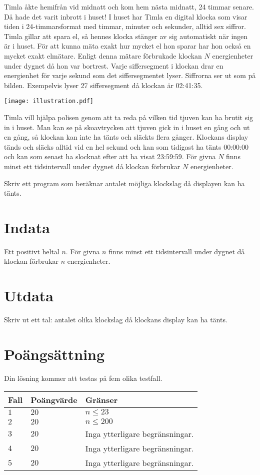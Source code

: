 Timla åkte hemifrån vid midnatt och kom hem nästa midnatt, 24 timmar senare. Då hade det varit inbrott i huset! 
I huset har Timla en digital klocka som visar tiden i 24-timmarsformat med timmar, minuter och sekunder, alltid sex siffror. Timla gillar att spara el, så hennes klocka stänger av sig automatiskt när ingen är i huset. För att kunna mäta exakt hur mycket el hon sparar har hon också en mycket exakt elmätare. Enligt denna mätare förbrukade klockan $N$ energienheter under dygnet då hon var bortrest. Varje siffersegment i klockan drar en energienhet för varje sekund som det siffersegmentet lyser. Siffrorna ser ut som på bilden. Exempelvis lyser 27 siffersegment då klockan är 02:41:35.

\begin{center}
  \texttt{[image: illustration.pdf]}
\end{center}

Timla vill hjälpa polisen genom att ta reda på vilken tid tjuven kan ha brutit sig in i huset. Man kan se på skoavtrycken att tjuven gick in i huset en gång och ut en gång, så klockan kan inte ha tänts och släckts flera gånger. Klockans display tänds och släcks alltid vid en hel sekund och kan som tidigast ha tänts 00:00:00 och kan som senast ha slocknat efter att ha visat 23:59:59. För givna $N$ finns minst ett tidsintervall under dygnet då klockan förbrukar $N$ energienheter.

Skriv ett program som beräknar antalet möjliga klockslag då displayen kan ha tänts. 

\section*{Indata}
Ett positivt heltal $n$. För givna $n$ finns minst ett tidsintervall under dygnet då klockan förbrukar $n$ energienheter.

\section*{Utdata}
Skriv ut ett tal: antalet olika klockslag då klockans display kan ha tänts. 

\section*{Poängsättning}
Din lösning kommer att testas på fem olika testfall.

\noindent
\begin{tabular}{| l | l | l |}
  \hline
  Fall & Poängvärde & Gränser \\ \hline
  $1$    & $20$        &  $n \le 23$ \\ \hline 
  $2$    & $20$        &  $n \le 200$ \\ \hline 
  $3$    & $20$        &  Inga ytterligare begränsningar. \\ \hline
  $4$    & $20$        &  Inga ytterligare begränsningar. \\ \hline
  $5$    & $20$        &  Inga ytterligare begränsningar. \\ \hline
\end{tabular}

